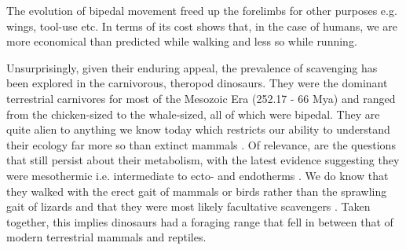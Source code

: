 \documentclass[a4paper,12pt]{article}
\begin{document}
The evolution of bipedal movement freed up the forelimbs for other purposes e.g. wings, tool-use etc. 
In terms of its cost \cite{alexander2004bipedal} shows that, in the case of humans, we are more economical than predicted while walking and less so while running. 

Unsurprisingly, given their enduring appeal, the prevalence of scavenging has been explored in the carnivorous, theropod dinosaurs.
They were the dominant terrestrial carnivores for most of the Mesozoic Era (252.17 - 66 Mya) and ranged from the chicken-sized to the whale-sized, all of which were bipedal.
They are quite alien to anything we know today which restricts our ability to understand their ecology far more so than extinct mammals \citep{weishampel2004dinosauria}.
Of relevance, are the questions that still persist about their metabolism, with the latest evidence suggesting they were mesothermic i.e. intermediate to ecto- and endotherms \citep{grady2014evidence}. 
We do know that they walked with the erect gait of mammals or birds rather than the sprawling gait of lizards and that they were most likely facultative scavengers \citep{weishampel2004dinosauria,depalma2013physical}. %
Taken together, this implies dinosaurs had a foraging range that fell in between that of modern terrestrial mammals and reptiles. 


\end{document}
